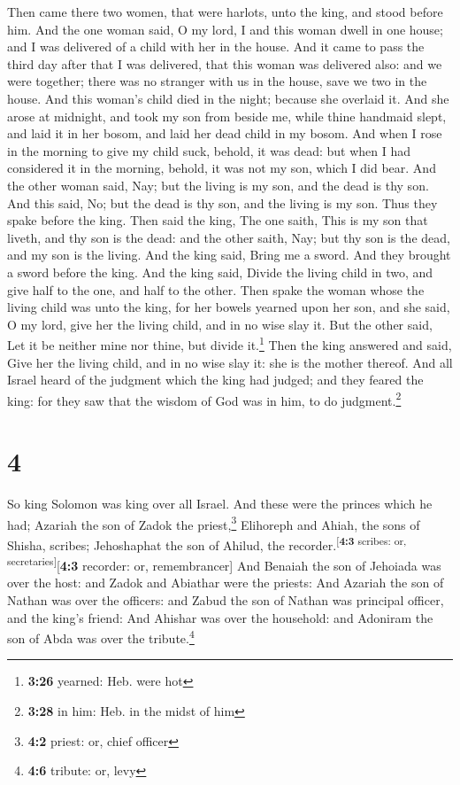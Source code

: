  Then came there two women, that were harlots, unto the
king, and stood before him.  And the one woman said, O my
lord, I and this woman dwell in one house; and I was delivered of a
child with her in the house.  And it came to pass the
third day after that I was delivered, that this woman was delivered
also: and we were together; there was no stranger with us in the house,
save we two in the house.  And this woman's child died in
the night; because she overlaid it.  And she arose at
midnight, and took my son from beside me, while thine handmaid slept,
and laid it in her bosom, and laid her dead child in my bosom.
 And when I rose in the morning to give my child suck,
behold, it was dead: but when I had considered it in the morning,
behold, it was not my son, which I did bear.  And the
other woman said, Nay; but the living is my son, and the dead is thy
son. And this said, No; but the dead is thy son, and the living is my
son. Thus they spake before the king.  Then said the
king, The one saith, This is my son that liveth, and thy son is the
dead: and the other saith, Nay; but thy son is the dead, and my son is
the living.  And the king said, Bring me a sword. And
they brought a sword before the king.  And the king said,
Divide the living child in two, and give half to the one, and half to
the other.  Then spake the woman whose the living child
was unto the king, for her bowels yearned upon her son, and she said, O
my lord, give her the living child, and in no wise slay it. But the
other said, Let it be neither mine nor thine, but divide it.\footnote{\textbf{3:26}
  yearned: Heb. were hot}  Then the king answered and
said, Give her the living child, and in no wise slay it: she is the
mother thereof.  And all Israel heard of the judgment
which the king had judged; and they feared the king: for they saw that
the wisdom of God was in him, to do judgment.\footnote{\textbf{3:28} in
  him: Heb. in the midst of him}

\hypertarget{section-3}{%
\section{4}\label{section-3}}

 So king Solomon was king over all Israel. 
And these were the princes which he had; Azariah the son of Zadok the
priest,\footnote{\textbf{4:2} priest: or, chief officer} 
Elihoreph and Ahiah, the sons of Shisha, scribes; Jehoshaphat the son of
Ahilud, the recorder.\textsuperscript{{[}\textbf{4:3} scribes: or,
secretaries{]}}{[}\textbf{4:3} recorder: or, remembrancer{]}
 And Benaiah the son of Jehoiada was over the host: and
Zadok and Abiathar were the priests:  And Azariah the son
of Nathan was over the officers: and Zabud the son of Nathan was
principal officer, and the king's friend:  And Ahishar was
over the household: and Adoniram the son of Abda was over the
tribute.\footnote{\textbf{4:6} tribute: or, levy}

